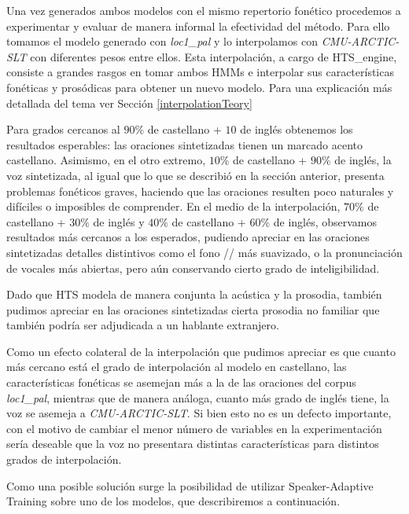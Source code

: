 Una vez generados ambos modelos con el mismo repertorio fonético procedemos a experimentar y evaluar de manera informal la efectividad del método. Para ello tomamos el modelo generado con \textit{loc1\_pal} y lo interpolamos con \textit{CMU-ARCTIC-SLT} con diferentes pesos entre ellos. Esta interpolación, a cargo de HTS\_engine, consiste a grandes rasgos en tomar ambos HMMs e interpolar sus características fonéticas y prosódicas para obtener un nuevo modelo. Para una explicación más detallada del tema ver Sección \ref{interpolationTeory}

Para grados cercanos al $90\%$ de castellano + $10$ de inglés obtenemos los resultados esperables: las oraciones sintetizadas tienen un marcado acento castellano. Asimismo, en el otro extremo, $10\%$ de castellano + $90\%$ de inglés, la voz sintetizada, al igual que lo que se describió en la sección anterior, presenta problemas fonéticos graves, haciendo que las oraciones resulten poco naturales y difíciles o imposibles de comprender. En el medio de la interpolación, $70\%$ de castellano + $30\%$ de inglés y $40\%$ de castellano + $60\%$ de inglés, observamos resultados más cercanos a los esperados, pudiendo apreciar en las oraciones sintetizadas detalles distintivos como el fono // más suavizado, o la pronunciación de vocales más abiertas, pero aún conservando cierto grado de inteligibilidad.

Dado que HTS modela de manera conjunta la acústica y la prosodia, también pudimos apreciar en las oraciones sintetizadas cierta prosodia no familiar que también podría ser adjudicada a un hablante extranjero.  

Como un efecto colateral de la interpolación que pudimos apreciar es que cuanto más cercano está el grado de interpolación al modelo en castellano, las características fonéticas se asemejan más a la de las oraciones del corpus \textit{loc1\_pal}, mientras que de manera análoga, cuanto más grado de inglés tiene, la voz se asemeja a \textit{CMU-ARCTIC-SLT}. Si bien esto no es un defecto importante, con el motivo de cambiar el menor número de variables en la experimentación sería deseable que la voz no presentara distintas características para distintos grados de interpolación.

Como una posible solución surge la posibilidad de utilizar Speaker-Adaptive Training sobre uno de los modelos, que describiremos a continuación.